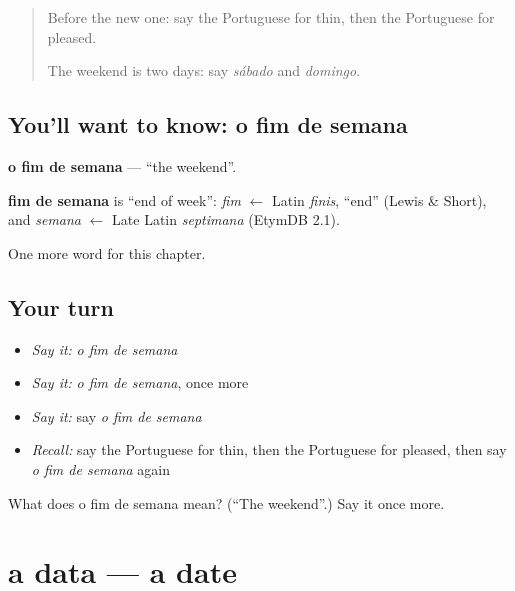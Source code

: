 \label{lesson:PT-C128-fim-de-semana}



\begin{quote}
Before the new one: say the Portuguese for thin, then the Portuguese for pleased.

The weekend is two days: say \emph{sábado} and \emph{domingo}.
\end{quote}

\subsection*{You'll want to know: o fim de semana}
\textbf{o fim de semana} — \textquotedblleft{}the weekend\textquotedblright{}.

\begin{cousinweb}
\textbf{fim de semana} is \textquotedblleft{}end of week\textquotedblright{}: \emph{fim} $\leftarrow$ Latin \emph{finis}, \textquotedblleft{}end\textquotedblright{} (Lewis \& Short), and \emph{semana} $\leftarrow$ Late Latin \emph{septimana} (EtymDB 2.1).
\end{cousinweb}

\begin{grammarlens}[title={What you've built}]
One more word for this chapter.
\end{grammarlens}

\subsection*{Your turn}
\begin{itemize}
\raggedright
  \item \emph{Say it:} \emph{o fim de semana}
  \item \emph{Say it:} \emph{o fim de semana}, once more
  \item \emph{Say it:} say \emph{o fim de semana}
  \item \emph{Recall:} say the Portuguese for thin, then the Portuguese for pleased, then say \emph{o fim de semana} again
\end{itemize}

\begin{tcolorbox}[breakable,colback=teal!4,colframe=teal!35!black,title={Before you move on}]
What does o fim de semana mean? (\textquotedblleft{}The weekend\textquotedblright{}.) Say it once more.
\end{tcolorbox}
\section[a data]{a data — a date}

